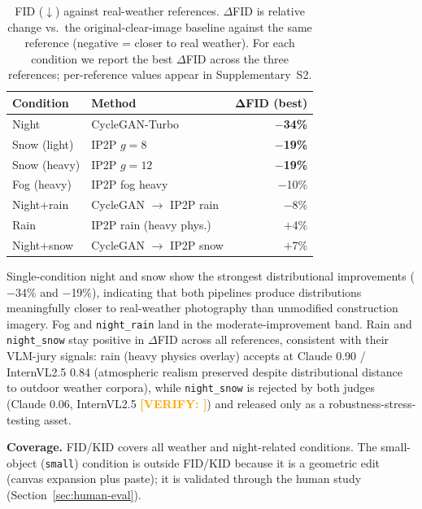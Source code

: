 \documentclass[12pt]{article}
\newcommand{\verify}[1]{\textcolor{orange}{\textbf{[VERIFY: #1]}}}
\begin{document}
\begin{table}[H]
\centering
\caption{FID ($\downarrow$) against real-weather references. $\Delta$FID is relative change vs.\ the original-clear-image baseline against the same reference (negative = closer to real weather). For each condition we report the best $\Delta$FID across the three references; per-reference values appear in Supplementary~S2.}
\label{tab:fid-kid}
\small
\begin{tabular}{llr}
\toprule
\textbf{Condition} & \textbf{Method} & $\boldsymbol{\Delta}$\textbf{FID (best)} \\
\midrule
Night        & CycleGAN-Turbo             & \textbf{$-$34\%} \\
Snow (light) & IP2P $g{=}8$               & \textbf{$-$19\%} \\
Snow (heavy) & IP2P $g{=}12$              & \textbf{$-$19\%} \\
Fog (heavy)  & IP2P fog heavy             & $-$10\% \\
Night+rain   & CycleGAN $\to$ IP2P rain   & $-$8\% \\
Rain         & IP2P rain (heavy phys.)    & $+$4\% \\
Night+snow   & CycleGAN $\to$ IP2P snow   & $+$7\% \\
\bottomrule
\end{tabular}
\end{table}

Single-condition night and snow show the strongest distributional improvements ($-$34\% and $-$19\%), indicating that both pipelines produce distributions meaningfully closer to real-weather photography than unmodified construction imagery. Fog and \texttt{night\_rain} land in the moderate-improvement band. Rain and \texttt{night\_snow} stay positive in $\Delta$FID across all references, consistent with their VLM-jury signals: rain (heavy physics overlay) accepts at Claude 0.90 / InternVL2.5 0.84 (atmospheric realism preserved despite distributional distance to outdoor weather corpora), while \texttt{night\_snow} is rejected by both judges (Claude 0.06, InternVL2.5 \verify{}) and released only as a robustness-stress-testing asset.

\textbf{Coverage.} FID/KID covers all weather and night-related conditions. The small-object (\texttt{small}) condition is outside FID/KID because it is a geometric edit (canvas expansion plus paste); it is validated through the human study (Section~\ref{sec:human-eval}).

\end{document}

